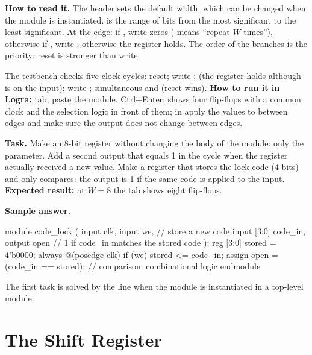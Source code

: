 
\textbf{How to read it.} The header  sets the default
width, which can be changed when the module is instantiated. \code{[W-1:0]} is
the range of bits from the most significant to the least significant. At the
edge: if , write zeros ( means ``repeat 
$W$ times''), otherwise if , write ; otherwise the register
holds. The order of the branches is the priority: reset is stronger than write.

The testbench  checks five clock cycles: reset; write
;  (the register holds  although  is on the
input); write ; simultaneous  and  (reset wins).
\textbf{How to run it in Logra:}  tab, paste the module, Ctrl+Enter;
 shows four flip-flops with a common clock and the selection logic in
front of them; in  apply the values  to 
between edges and make sure the output does not change between edges.

\begin{diybox}
\textbf{Task.}  Make an 8-bit register without changing the body of
the module: only the parameter.  Add a second output 
that equals 1 in the cycle when the register actually received a new value.
 Make a register that stores the lock code (4 bits) and only compares:
the output  is 1 if the same code is applied to the input.\\
\textbf{Expected result:} at $W=8$ the  tab shows eight flip-flops.
\end{diybox}

\textbf{Sample answer.}
\begin{vcode}
module code_lock (
    input        clk,
    input        we,         // store a new code
    input  [3:0] code_in,
    output       open        // 1 if code_in matches the stored code
);
    reg [3:0] stored = 4'b0000;
    always @(posedge clk) if (we) stored <= code_in;
    assign open = (code_in == stored);   // comparison: combinational logic
endmodule
\end{vcode}
The first task is solved by the line  when
the module is instantiated in a top-level module.

\section{The Shift Register}

